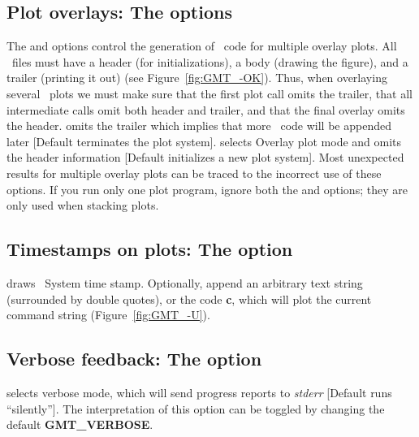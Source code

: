 \subsection{Plot overlays: The   options}


The  and  options control the generation of \PS\ code for multiple
overlay plots.  All \PS\ files must have a header (for initializations),
a body (drawing the figure), and a trailer (printing it out) (see
Figure~\ref{fig:GMT_-OK}).  Thus,
when overlaying several \GMT\ plots we must make sure that the first plot
call omits the trailer, that all intermediate calls omit both header and
trailer, and that the final overlay omits the header.
 omits the trailer which implies that more \PS\ code will be appended
later [Default terminates the plot system].   selects Overlay plot
mode and omits the header information [Default initializes a new plot system].
Most unexpected results for multiple overlay plots can be traced to the
incorrect use of these options.  If you run only one plot
program, ignore both the  and  options; they are
only used when stacking plots. 

\subsection{Timestamps on plots: The  option} 

 draws \UNIX\ System time stamp.  Optionally, append an arbitrary
text string (surrounded by double quotes), or the code \textbf{c}, which will
plot the current command string (Figure~\ref{fig:GMT_-U}).


\subsection{Verbose feedback: The  option} 
\label{sec:verbose}
 selects verbose mode, which will send progress reports to
\emph{stderr} [Default runs ``silently''].  The interpretation of
this option can be toggled by changing the default \textbf{GMT\_VERBOSE}.

